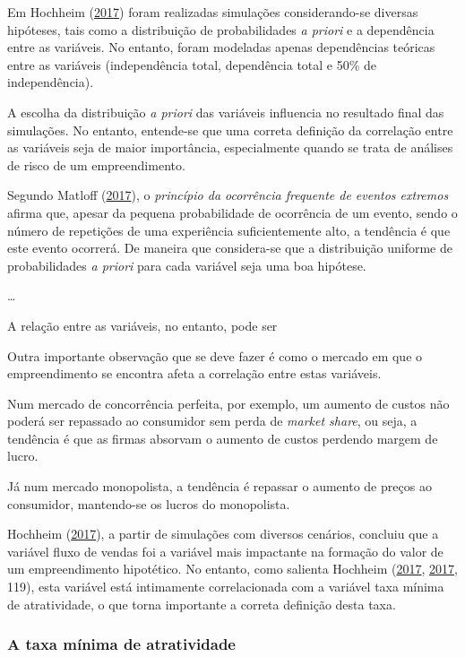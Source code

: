 \documentclass[
	12pt,				%
	oneside,			%
	a4paper,			%
	chapter=TITLE,		%
	section=TITLE,		%
	english,			%
	brazil				%
	]{abntex2}
\begin{document}
Em Hochheim (\protect\hyperlink{ref-gahochheim}{2017}) foram realizadas simulações considerando-se diversas hipóteses,
tais como a distribuição de probabilidades \emph{a priori} e a dependência entre as
variáveis. No entanto, foram modeladas apenas dependências teóricas entre as
variáveis (independência total, dependência total e 50\% de independência).

A escolha da distribuição \emph{a priori} das variáveis influencia no resultado final
das simulações. No entanto, entende-se que uma correta definição da correlação
entre as variáveis seja de maior importância, especialmente quando se trata
de análises de risco de um empreendimento.

Segundo Matloff (\protect\hyperlink{ref-matloff2017}{2017}), o \emph{princípio da ocorrência frequente de eventos extremos}
afirma que, apesar da pequena probabilidade de ocorrência de um evento, sendo
o número de repetições de uma experiência suficientemente alto, a tendência é
que este evento ocorrerá. De maneira que considera-se que a distribuição
uniforme de probabilidades \emph{a priori} para cada variável seja uma boa hipótese.

\ldots{}

A relação entre as variáveis, no entanto, pode ser

Outra importante observação que se deve fazer é como o mercado em que o
empreendimento se encontra afeta a correlação entre estas variáveis.

Num mercado de concorrência perfeita, por exemplo, um aumento de custos não
poderá ser repassado ao consumidor sem perda de \emph{market share}, ou seja, a
tendência é que as firmas absorvam o aumento de custos perdendo margem de lucro.

Já num mercado monopolista, a tendência é repassar o aumento de preços ao
consumidor, mantendo-se os lucros do monopolista.

Hochheim (\protect\hyperlink{ref-gahochheim}{2017}), a partir de simulações com diversos cenários, concluiu que a
variável fluxo de vendas foi a variável mais impactante na formação do valor
de um empreendimento hipotético. No entanto, como salienta Hochheim (\protect\hyperlink{ref-gahochheim}{2017}, \protect\hyperlink{ref-gahochheim}{2017}, 119), esta variável está intimamente correlacionada com a
variável taxa mínima de atratividade, o que torna importante a correta definição
desta taxa.

\hypertarget{a-taxa-muxednima-de-atratividade}{%
\subsubsection{A taxa mínima de atratividade}\label{a-taxa-muxednima-de-atratividade}}
\end{document}
